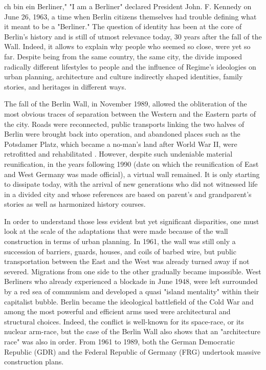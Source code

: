 \label{ch:a-quest-for-identity-in-berlin}

{\flushright{}}
\smallskip

ch bin ein Berliner," "I am a Berliner" declared President John. F.
   Kennedy on June 26, 1963, a time when Berlin citizens themselves had
   trouble defining what it meant to be a "Berliner." The question of
   identity has been at the core of Berlin's history and is still of
   utmost relevance today, 30 years after the fall of the Wall.  Indeed,
   it allows to explain why people who seemed so close, were yet so far.
   Despite being from the same country, the same city, the divide imposed
   radically different lifestyles to people and the influence of Regime's
   ideologies on urban planning, architecture and culture indirectly
   shaped identities, family stories, and heritages in different ways.

   The fall of the Berlin Wall, in November 1989, allowed the obliteration
   of the most obvious traces of separation between the Western and the
   Eastern parts of the city. Roads were reconnected, public transports
   linking the two halves of Berlin were brought back into operation, and
   abandoned places such as the Potsdamer Platz, which became a no-man's
   land after World War II, were retrofitted and rehabilitated . However,
   despite such undeniable material reunification, in the years following
   1990 (date on which the reunification of East and West Germany was made
   official), a virtual wall remained. It is only starting to dissipate
   today, with the arrival of new generations who did not witnessed life
   in a divided city and whose references are based on parent's and
   grandparent's stories as well as harmonized history courses.

   In order to understand those less evident but yet significant
   disparities, one must look at the scale of the adaptations that were
   made because of the wall construction in terms of urban planning. In
   1961, the wall was still only a succession of barriers, guards, houses,
   and coils of barbed wire, but public transportation between the East
   and the West was already turned away if not severed. Migrations from
   one side to the other gradually became impossible. West Berliners who
   already experienced a blockade in June 1948, were left surrounded by a
   red sea of communism and developed a quasi "island mentality" within
   their capitalist bubble. Berlin became the ideological battlefield of
   the Cold War and among the most powerful and efficient arms used were
   architectural and structural choices. Indeed, the conflict is
   well-known for its space-race, or its nuclear arm-race, but the case of
   the Berlin Wall  also shows that an "architecture race" was also in
   order. From 1961 to 1989, both the German Democratic Republic (GDR) and
   the Federal Republic of Germany (FRG) undertook massive construction
   plans.
   
